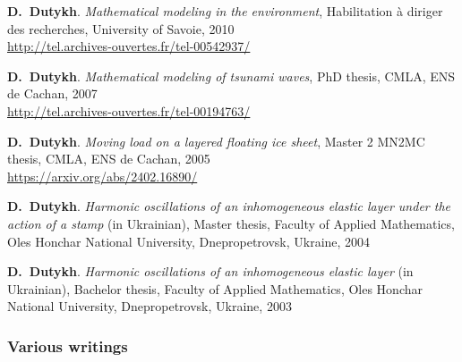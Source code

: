 \begin{etaremune}
  
  \item \textbf{D.~Dutykh}. \textit{Mathematical modeling in the environment}, Habilitation \`a diriger des recherches, University of Savoie, 2010 \\ %
  \url{http://tel.archives-ouvertes.fr/tel-00542937/}
  
  \item \textbf{D.~Dutykh}. \textit{Mathematical modeling of tsunami waves}, PhD thesis, CMLA, ENS de Cachan, 2007 \\ %
  \url{http://tel.archives-ouvertes.fr/tel-00194763/}
  
  \item \textbf{D.~Dutykh}. \textit{Moving load on a layered floating ice sheet}, Master 2 MN2MC thesis, CMLA, ENS de Cachan, 2005 \\ %
  \url{https://arxiv.org/abs/2402.16890/}
  
  \item \textbf{D.~Dutykh}. \textit{Harmonic oscillations of an inhomogeneous elastic layer under the action of a stamp} (in Ukrainian), Master thesis, Faculty of Applied Mathematics, Oles Honchar National University, Dnepropetrovsk, Ukraine, 2004 %

  \item \textbf{D.~Dutykh}. \textit{Harmonic oscillations of an inhomogeneous elastic layer} (in Ukrainian), Bachelor thesis, Faculty of Applied Mathematics, Oles Honchar National University, Dnepropetrovsk, Ukraine, 2003 %
  
\end{etaremune}

\separator
\subsubsection{Various writings}

